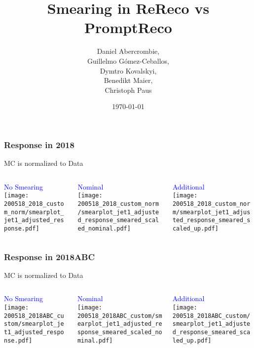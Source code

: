 \documentclass{beamer}
\author[D. Abercrombie]{
  Daniel Abercrombie, \\
  Guillelmo G\'omez-Ceballos, \\
  Dymtro Kovalskyi, \\
  Benedikt Maier, \\
  Christoph Paus
}
\title{\bf \sffamily Smearing in ReReco vs PromptReco}
\date{\today}
\begin{document}
\begin{frame}
  \titlepage
\end{frame}

\begin{frame}
  \frametitle{Response in 2018}

  \centering
  MC is normalized to Data
  \vfill

  \begin{columns}
    \begin{column}{0.33\linewidth}
      \centering
      \textcolor{blue}{No Smearing} \\
      \texttt{[image: 200518\_2018\_custom\_norm/smearplot\_jet1\_adjusted\_response.pdf]}
    \end{column}
    \begin{column}{0.34\linewidth}
      \centering
      \textcolor{blue}{Nominal} \\
      \texttt{[image: 200518\_2018\_custom\_norm/smearplot\_jet1\_adjusted\_response\_smeared\_scaled\_nominal.pdf]}
    \end{column}
    \begin{column}{0.33\linewidth}
      \centering
      \textcolor{blue}{Additional} \\
      \texttt{[image: 200518\_2018\_custom\_norm/smearplot\_jet1\_adjusted\_response\_smeared\_scaled\_up.pdf]}
    \end{column}
  \end{columns}

\end{frame}

\begin{frame}
  \frametitle{Response in 2018ABC}

  \centering
  MC is normalized to Data
  \vfill

  \begin{columns}
    \begin{column}{0.33\linewidth}
      \centering
      \textcolor{blue}{No Smearing} \\
      \texttt{[image: 200518\_2018ABC\_custom/smearplot\_jet1\_adjusted\_response.pdf]}
    \end{column}
    \begin{column}{0.34\linewidth}
      \centering
      \textcolor{blue}{Nominal} \\
      \texttt{[image: 200518\_2018ABC\_custom/smearplot\_jet1\_adjusted\_response\_smeared\_scaled\_nominal.pdf]}
    \end{column}
    \begin{column}{0.33\linewidth}
      \centering
      \textcolor{blue}{Additional} \\
      \texttt{[image: 200518\_2018ABC\_custom/smearplot\_jet1\_adjusted\_response\_smeared\_scaled\_up.pdf]}
    \end{column}
  \end{columns}

\end{frame}
\end{document}
